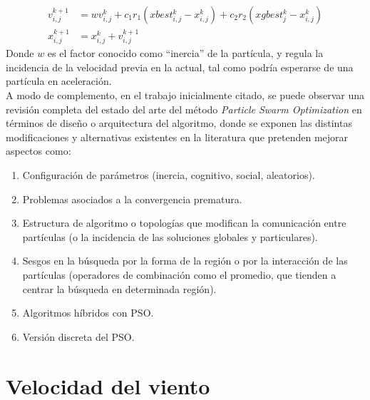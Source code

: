 \begin{align}\label{eq:PSO}
    v_{i,j}^{k+1} &= wv_{i,j}^{k} + c_{1}r_{1}(xbest_{i,j}^k - x_{i,j}^k) + c_{2}r_{2}(xgbest_{j}^{k} - x_{i,j}^k)\\
    x_{i,j}^{k+1} &= x_{i,j}^{k} + v_{i,j}^{k+1}
\end{align}    
Donde $w$ es el factor conocido como ``inercia'' de la partícula, y regula la incidencia de la velocidad previa en la actual, tal como podría esperarse de una partícula en aceleración.\\
A modo de complemento, en el trabajo inicialmente citado, se puede observar una revisión completa del estado del arte del método \emph{Particle Swarm Optimization} en términos de diseño o arquitectura del algoritmo, donde se exponen las distintas modificaciones y alternativas existentes en la literatura que pretenden mejorar aspectos como:
\begin{enumerate}
    \item  Configuración de parámetros (inercia, cognitivo, social, aleatorios).
    \item  Problemas asociados a la convergencia prematura.
    \item  Estructura de algoritmo o topologías que modifican la comunicación entre partículas (o la incidencia de las soluciones globales y particulares).
    \item  Sesgos en la búsqueda por la forma de la región o por la interacción de las partículas (operadores de combinación como el promedio, que tienden a centrar la búsqueda en determinada región).
    \item  Algoritmos híbridos con PSO.
    \item  Versión discreta del PSO. 
\end{enumerate}  

\section{Velocidad del viento}
